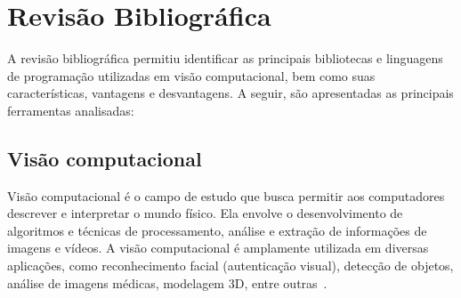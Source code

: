 \section{Revisão Bibliográfica}

A revisão bibliográfica permitiu identificar as principais bibliotecas e linguagens de programação utilizadas em visão computacional, bem como suas características, vantagens e desvantagens. A seguir, são apresentadas as principais ferramentas analisadas:

\subsection{Visão computacional}
Visão computacional é o campo de estudo que busca permitir aos computadores descrever e interpretar o mundo físico. Ela envolve o desenvolvimento de algoritmos e técnicas de processamento, análise e extração de informações de imagens e vídeos. A visão computacional é amplamente utilizada em diversas aplicações, como reconhecimento facial (autenticação visual), detecção de objetos, análise de imagens médicas, modelagem 3D, entre outras~\citep{Szeliski2022}.

